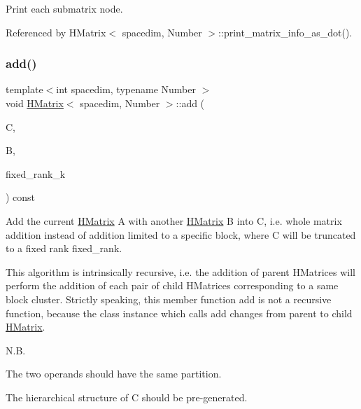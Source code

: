 Print each submatrix node.

Referenced by H\+Matrix$<$ spacedim, Number $>$\+::print\+\_\+matrix\+\_\+info\+\_\+as\+\_\+dot().

\mbox{\label{classHMatrix_a8f96186426cd3147d5af32ca84ad25ea}} 
\subsubsection{\texorpdfstring{add()}{add()}\hspace{0.1cm}{\footnotesize\ttfamily [1/10]}}
{\footnotesize\ttfamily template$<$int spacedim, typename Number $>$ \\
void \hyperlink{classHMatrix}{H\+Matrix}$<$ spacedim, Number $>$\+::add (\begin{DoxyParamCaption}\item[{\hyperlink{classHMatrix}{H\+Matrix}$<$ spacedim, Number $>$ \&}]{C,  }\item[{const \hyperlink{classHMatrix}{H\+Matrix}$<$ spacedim, Number $>$ \&}]{B,  }\item[{const \hyperlink{classHMatrix_a5ca8dc549783d38371a01ecd621ecb34}{size\+\_\+type}}]{fixed\+\_\+rank\+\_\+k }\end{DoxyParamCaption}) const}

Add the current \hyperlink{classHMatrix}{H\+Matrix} {\ttfamily A} with another \hyperlink{classHMatrix}{H\+Matrix} {\ttfamily B} into {\ttfamily C}, i.\+e. whole matrix addition instead of addition limited to a specific block, where {\ttfamily C} will be truncated to a fixed rank {\ttfamily fixed\+\_\+rank}.

This algorithm is intrinsically recursive, i.\+e. the addition of parent H\+Matrices will perform the addition of each pair of child H\+Matrices corresponding to a same block cluster. Strictly speaking, this member function {\ttfamily add} is not a recursive function, because the class instance which calls {\ttfamily add} changes from parent to child \hyperlink{classHMatrix}{H\+Matrix}.

N.\+B.


\begin{DoxyEnumerate}
\item The two operands should have the same partition.
\item The hierarchical structure of {\ttfamily C} should be pre-\/generated.
\end{DoxyEnumerate}


